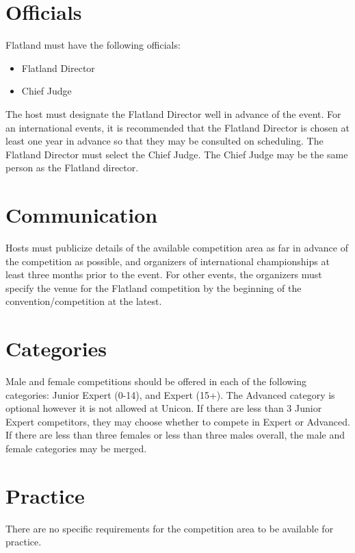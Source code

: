 \section{Officials}

Flatland must have the following officials:
\begin{itemize}
\item Flatland Director
\item Chief Judge
\end{itemize}

The host must designate the Flatland Director well in advance of the event.
For an international events, it is recommended that the Flatland Director is chosen at least one year in advance so that they may be consulted on scheduling.
The Flatland Director must select the Chief Judge.
The Chief Judge may be the same person as the Flatland director.

\section{Communication}

Hosts must publicize details of the available competition area as far in advance of the competition as possible, and organizers of international championships at least three months prior to the event.
For other events, the organizers must specify the venue for the Flatland competition by the beginning of the convention/competition at the latest.

\section{Categories}
Male and female competitions should be offered in each of the following categories: Junior Expert (0-14), and Expert (15+).
The Advanced category is optional however it is not allowed at Unicon.
If there are less than 3 Junior Expert competitors, they may choose whether to compete in Expert or Advanced.
If there are less than three females or less than three males overall, the male and female categories may be merged.

\section{Practice}

There are no specific requirements for the competition area to be available for practice.
